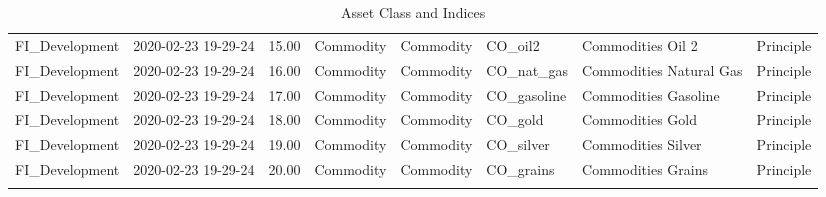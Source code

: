 \begin{longtable}{llrlllll}
  FI\_Development & 2020-02-23 19-29-24 & 15.00 & Commodity & Commodity & CO\_oil2 & Commodities Oil 2 & Principle \\ 
  FI\_Development & 2020-02-23 19-29-24 & 16.00 & Commodity & Commodity & CO\_nat\_gas & Commodities Natural Gas & Principle \\ 
  FI\_Development & 2020-02-23 19-29-24 & 17.00 & Commodity & Commodity & CO\_gasoline & Commodities Gasoline & Principle \\ 
  FI\_Development & 2020-02-23 19-29-24 & 18.00 & Commodity & Commodity & CO\_gold & Commodities Gold & Principle \\ 
  FI\_Development & 2020-02-23 19-29-24 & 19.00 & Commodity & Commodity & CO\_silver & Commodities Silver & Principle \\ 
  FI\_Development & 2020-02-23 19-29-24 & 20.00 & Commodity & Commodity & CO\_grains & Commodities Grains & Principle \\ 
   \hline
\hline
\caption{Asset Class and Indices} 
\end{longtable}
